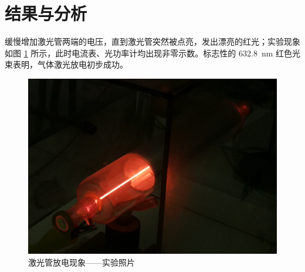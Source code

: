 \documentclass[aps,pre,12pt,preprint,%
	onecolumn,showpacs,showkeys,nofootinbib]{revtex4-1}
\begin{document}
\section{结果与分析}
%
%
	缓慢增加激光管两端的电压，直到激光管突然被点亮，发出漂亮的红光；实验现象如图 \ref{fig:photo} 所示，此时电流表、光功率计均出现非零示数。标志性的 \SI{632.8}{\nm} 红色光束表明，气体激光放电初步成功。
	\begin{figure}[!h]
	\centering
	\vspace{.2\baselineskip}
	\includegraphics[width=.75\linewidth]{laser.jpg}
	\caption[激光管放电现象]{激光管放电现象——实验照片}
	\label{fig:photo}
	\end{figure}
\FloatBarrier
	
\end{document}
